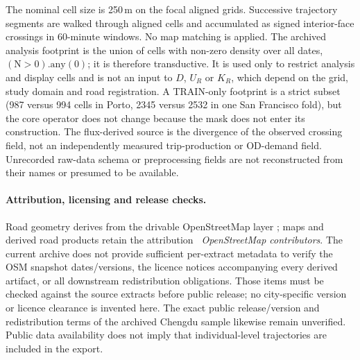The nominal cell size is 250\,m on the focal aligned grids. Successive trajectory segments are walked through aligned cells and accumulated as signed interior-face crossings in 60-minute windows. No map matching is applied. The archived analysis footprint is the union of cells with non-zero density over all dates, $(\mathrm{N}>0).\mathrm{any}(0)$; it is therefore transductive. It is used only to restrict analysis and display cells and is not an input to $D$, $U_R$ or $K_R$, which depend on the grid, study domain and road registration. A TRAIN-only footprint is a strict subset (987 versus 994 cells in Porto, 2345 versus 2532 in one San Francisco fold), but the core operator does not change because the mask does not enter its construction. The flux-derived source is the divergence of the observed crossing field, not an independently measured trip-production or OD-demand field. Unrecorded raw-data schema or preprocessing fields are not reconstructed from their names or presumed to be available.

\paragraph{Attribution, licensing and release checks.} Road geometry derives from the drivable OpenStreetMap layer \cite{haklay2008}; maps and derived road products retain the attribution \emph{\textcopyright~OpenStreetMap contributors}. The current archive does not provide sufficient per-extract metadata to verify the OSM snapshot dates/versions, the licence notices accompanying every derived artifact, or all downstream redistribution obligations. Those items must be checked against the source extracts before public release; no city-specific version or licence clearance is invented here. The exact public release/version and redistribution terms of the archived Chengdu sample likewise remain unverified. Public data availability does not imply that individual-level trajectories are included in the export.
